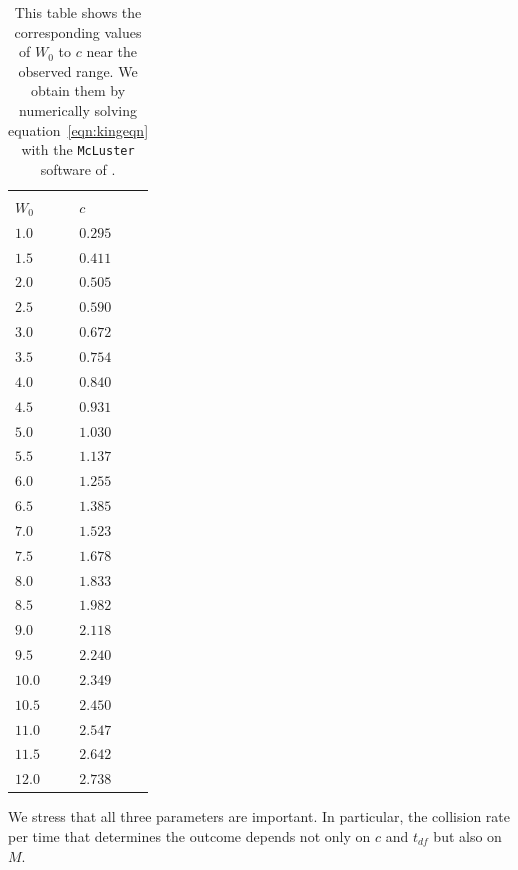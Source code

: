 \documentclass{princeton_astro_thesis}
\numberwithin{equation}{section}
\begin{document}
\begin{table}
\begin{center}
\begin{tabular}{l l}
\hline \hline \\
$W_{0}$ & $c$ \\
$1.0$ & $0.295$ \\
$1.5$ & $0.411$ \\
$2.0$ & $0.505$ \\
$2.5$ & $0.590$ \\
$3.0$ & $0.672$ \\
$3.5$ & $0.754$ \\
$4.0$ & $0.840$ \\
$4.5$ & $0.931$ \\
$5.0$ & $1.030$ \\
$5.5$ & $1.137$ \\
$6.0$ & $1.255$ \\
$6.5$ & $1.385$ \\
$7.0$ & $1.523$ \\
$7.5$ & $1.678$ \\
$8.0$ & $1.833$ \\
$8.5$ & $1.982$ \\
$9.0$ & $2.118$ \\
$9.5$ & $2.240$ \\
$10.0$ & $2.349$ \\
$10.5$ & $2.450$ \\
$11.0$ & $2.547$ \\
$11.5$ & $2.642$ \\
$12.0$ & $2.738$ \\

\end{tabular}
\end{center}
\caption{This table shows the corresponding values of $W_{0}$ to $c$ near the observed range. We obtain them by numerically solving equation~\ref{eqn:kingeqn} with the \texttt{McLuster} software of \citet{2011Kupper}.}
\label{tbl:ctable}
\end{table}

We stress that all three parameters are important. In particular,
the collision rate per time that determines the outcome 
depends not only on $c$ and $t_{df}$ but also on $M$.
\end{document}
